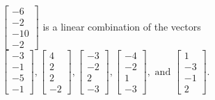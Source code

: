 \begin{exercise}
\begin{exerciseStatement}
  \end{exerciseStatement}
  \begin{exerciseAnswer}
   \(\left[\begin{array}{c}
-6 \\
-2 \\
-10 \\
-2
\end{array}\right]\) 
  	 is  
	a linear combination of the vectors \(\left[\begin{array}{c}
-3 \\
-1 \\
-5 \\
-1
\end{array}\right] , \left[\begin{array}{c}
4 \\
2 \\
2 \\
-2
\end{array}\right] , \left[\begin{array}{c}
-3 \\
-2 \\
2 \\
-3
\end{array}\right] , \left[\begin{array}{c}
-4 \\
-2 \\
1 \\
-3
\end{array}\right] , \text{ and } \left[\begin{array}{c}
1 \\
-3 \\
-1 \\
2
\end{array}\right]\).

	
  


  \end{exerciseAnswer}
\end{exercise}